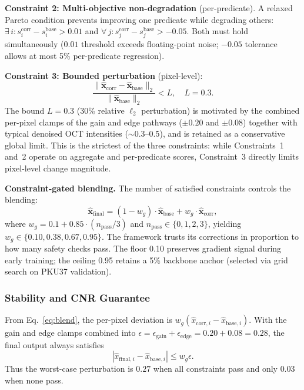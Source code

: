 \documentclass{ieeetj}
\begin{document}
\textbf{Constraint 2: Multi-objective non-degradation} (per-predicate). A relaxed Pareto condition prevents improving one predicate while degrading others: $\exists\, i: s_i^\text{corr} - s_i^\text{base} > 0.01$ and $\forall\, j: s_j^\text{corr} - s_j^\text{base} > -0.05$. Both must hold simultaneously ($0.01$ threshold exceeds floating-point noise; $-0.05$ tolerance allows at most 5\% per-predicate regression).

\textbf{Constraint 3: Bounded perturbation} (pixel-level):
\begin{equation}
\frac{\|\hat{\mathbf{x}}_\text{corr} - \hat{\mathbf{x}}_\text{base}\|_2}{\|\hat{\mathbf{x}}_\text{base}\|_2} < L, \quad L = 0.3.
\label{eq:bounded_perturbation}
\end{equation}
The bound $L = 0.3$ (30\% relative $\ell_2$ perturbation) is motivated by the combined per-pixel clamps of the gain and edge pathways ($\pm 0.20$ and $\pm 0.08$) together with typical denoised OCT intensities (${\sim}$0.3--0.5), and is retained as a conservative global limit. This is the strictest of the three constraints: while Constraints~1 and~2 operate on aggregate and per-predicate scores, Constraint~3 directly limits pixel-level change magnitude.

\textbf{Constraint-gated blending.} The number of satisfied constraints controls the blending:
\begin{equation}
\hat{\mathbf{x}}_\text{final} = (1 - w_g) \cdot \hat{\mathbf{x}}_\text{base} + w_g \cdot \hat{\mathbf{x}}_\text{corr},
\label{eq:blend}
\end{equation}
where $w_g = 0.1 + 0.85 \cdot (n_\text{pass}/3)$ and $n_\text{pass} \in \{0,1,2,3\}$, yielding $w_g \in \{0.10, 0.38, 0.67, 0.95\}$. The framework trusts its corrections in proportion to how many safety checks pass. The floor 0.10 preserves gradient signal during early training; the ceiling 0.95 retains a 5\% backbone anchor (selected via grid search on PKU37 validation).

\subsubsection{Stability and CNR Guarantee}

From Eq.~\eqref{eq:blend}, the per-pixel deviation is $w_g(\hat{x}_{\mathrm{corr},i}-\hat{x}_{\mathrm{base},i})$. With the gain and edge clamps combined into $\epsilon=\epsilon_{\mathrm{gain}}+\epsilon_{\mathrm{edge}}=0.20+0.08=0.28$, the final output always satisfies
\begin{equation}
|\hat{x}_{\mathrm{final},i}-\hat{x}_{\mathrm{base},i}| \le w_g\epsilon.
\label{eq:pixel_bound}
\end{equation}
Thus the worst-case perturbation is $0.27$ when all constraints pass and only $0.03$ when none pass.
\end{document}
